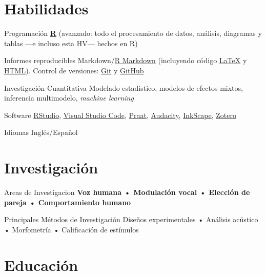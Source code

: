 \documentclass[11pt,a4paper,]{awesome-cv}
\begin{document}
\hypertarget{habilidades}{%
\section{Habilidades}\label{habilidades}}

\begin{cvskills}
  \cvskill
    {Programación}
    {\href{https://www.r-project.org/}{\textbf{R}} (avanzado: todo el procesamiento de datos, análisis, diagramas y tablas —e incluso esta HV— hechos en R)}

  \cvskill
    {Informes reproducibles}
    {Markdown/\href{https://rmarkdown.rstudio.com/}{R Markdown} (incluyendo código  \href{https://www.latex-project.org/}{{\selectfont\LaTeX}} y \href{https://html.spec.whatwg.org/}{HTML}). Control de versiones: \href{https://git-scm.com/}{Git} \faGit* y \href{https://github.com/JDLeongomez}{GitHub} \faGithub}

  \cvskill
    {Investigación Cuantitativa}
    {Modelado estadístico, modelos de efectos mixtos, inferencia multimodelo, \textit{machine learning}}

  \cvskill
    {Software}
    {\href{https://posit.co/products/open-source/rstudio/}{RStudio}, \href{https://code.visualstudio.com/}{Visual Studio Code}, \href{https://www.fon.hum.uva.nl/praat/}{Praat}, \href{https://www.audacityteam.org/}{Audacity}, \href{https://inkscape.org/}{InkScape}, \href{https://www.zotero.org/}{Zotero}}

  \cvskill
    {Idiomas}
    {Inglés/Español}
\end{cvskills}

\hypertarget{investigaciuxf3n}{%
\section{Investigación}\label{investigaciuxf3n}}

\begin{cvskills}
  \cvskill
    {Areas de Investigacion}
    {\textbf{Voz humana • Modulación vocal • Elección de pareja • Comportamiento humano}}

  \cvskill
    {Principales Métodos de Investigación}
    {Diseños experimentales • Análisis acústico • Morfometría • Calificación de estímulos}
\end{cvskills}

\hypertarget{educaciuxf3n}{%
\section{Educación}\label{educaciuxf3n}}
\end{document}
